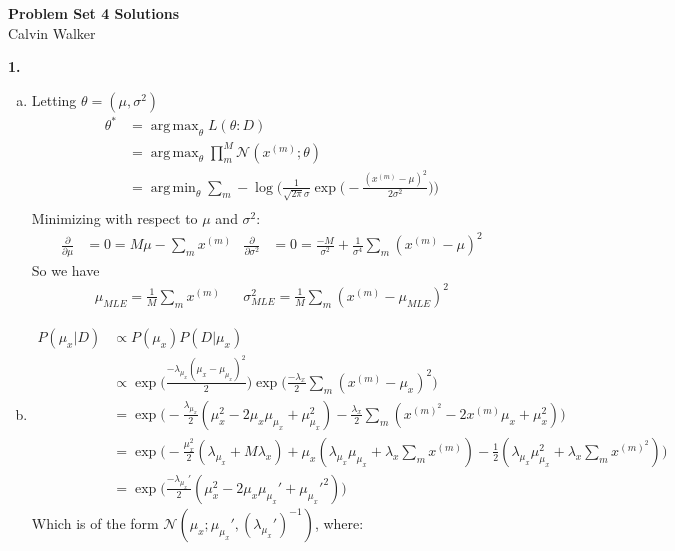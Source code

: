 \documentclass{article}
\DeclareMathOperator*{\argmax}{arg\,max}
\DeclareMathOperator*{\argmin}{arg\,min}
\begin{document}
\begin{center}
    \Large{\textbf{Problem Set 4 Solutions}} \\[0.25ex]
    Calvin Walker
\end{center}

\textbf{1.}
\begin{enumerate}[(a)]
    \item Letting $\theta = (\mu, \sigma^2)$\begin{align*}
        \theta^* &= \argmax_{\theta} L(\theta : D) \\
        &= \argmax_{\theta} \prod_{m}^M \mathcal{N}(x^{(m)}; \theta) \\ 
        &= \argmin_{\theta}\sum_{m} - \log\Bigg(\frac{1}{\sqrt{2\pi}\sigma}\exp\bigg(- \frac{(x^{(m)} - \mu)^2}{2\sigma^2}\bigg)\Bigg) \\
    \end{align*}
    Minimizing with respect to $\mu$ and $\sigma^2$: \begin{align*}
        \frac{\partial}{\partial \mu} &= 0 = M \mu - \sum_{m} x^{(m)} & \frac{\partial}{\partial \sigma^2} &= 0 = \frac{-M}{\sigma^2} + \frac{1}{\sigma^4}\sum_{m}(x^{(m)} - \mu)^2
    \end{align*}
    So we have \begin{align*}
        \mu_{MLE} = \frac{1}{M}\sum_{m}x^{(m)} & & \sigma^2_{MLE} = \frac{1}{M}\sum_{m}(x^{(m)} - \mu_{MLE})^2
    \end{align*}
    \item \begin{align*}
        P(\mu_x | D) &\propto P(\mu_x) P(D | \mu_x) \\[0.5ex]
        & \propto \exp \biggl( \frac{-\lambda_{\mu_x}(\mu_x - \mu_{\mu_x})^2}{2}\biggr) \exp \biggl( \frac{-\lambda_{x}}{2 } \sum_{m}(x^{(m)} - \mu_{x})^2\biggr) \\[0.5ex]
        &= \exp \biggl(-\frac{\lambda_{\mu_x}}{2}(\mu_x^2 - 2\mu_x\mu_{\mu_x} + \mu_{\mu_x}^2)  - \frac{\lambda_{x}}{2}\sum_m(x^{(m)^2} - 2x^{(m)}\mu_{x} + \mu_x^2) \biggr) \\[0.5ex]
        &= \exp \biggl(-\frac{\mu_x^2}{2}(\lambda_{\mu_x} + M\lambda_x) + \mu_x(\lambda_{\mu_x} \mu_{\mu_x} + \lambda_x\sum_m x^{(m)}) - \frac{1}{2}(\lambda_{\mu_x}\mu_{\mu_x}^2 + \lambda_x \sum_{m}x^{(m)^2}) \biggr) \\
        &= \exp \biggl(\frac{-\lambda_{\mu_x}'}{2}(\mu_x^2 - 2\mu_x\mu_{\mu_x}' + \mu_{\mu_x}'^2)\biggr)
    \end{align*}
    Which is of the form $\mathcal{N}(\mu_x ; \mu_{\mu_x}', (\lambda_{\mu_x}')^{-1})$, where: \begin{align*}

\end{align*}
\end{enumerate}
\end{document}
